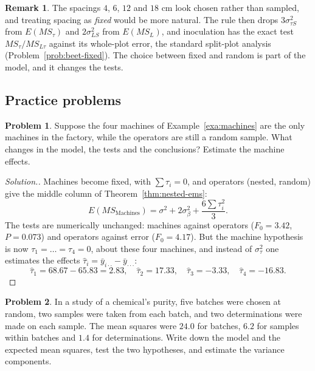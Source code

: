 \documentclass[11pt,a4paper]{article}
\numberwithin{equation}{section}
\theoremstyle{definition}
\newtheorem*{remark}{Remark}
\newtheorem{problemx}{Problem}[subsection]
\newenvironment{problem}{\begin{problemx}}{\end{problemx}}
\newenvironment{solution}
  {\renewcommand{\qedsymbol}{}\begin{proof}[\textit{Solution}.]}
  {\end{proof}}
\begin{document}
\begin{remark}
The spacings $4$, $6$, $12$ and $18$ cm look chosen rather than sampled, and treating spacing as \emph{fixed} would be more natural. The rule then drops $3\sigma^2_{\tau S}$ from
$E(MS_\tau)$ and $2\sigma^2_{LS}$ from $E(MS_L)$, and inoculation has the exact test $MS_\tau/MS_{L\tau}$ against its whole-plot error, the standard split-plot analysis
(Problem~\ref{prob:beet-fixed}). The choice between fixed and random is part of the model, and it changes the tests.
\end{remark}

\subsection{Practice problems}

\begin{problem}
Suppose the four machines of Example~\ref{exa:machines} are the only machines in the factory, while the operators are still a random sample. What changes
in the model, the tests and the conclusions? Estimate the machine effects.
\end{problem}

\begin{solution}
Machines become fixed, with $\sum\tau_i = 0$, and operators (nested, random) give the middle column of Theorem~\ref{thm:nested-ems}:
\[
E(MS_{\mathrm{Machines}}) = \sigma^2 + 2\sigma^2_\beta + \frac{6\sum\tau_i^2}3 .
\]
The tests are numerically unchanged: machines against operators ($F_0 = 3.42$, $P = 0.073$) and operators against error ($F_0 = 4.17$). But the machine hypothesis
is now $\tau_1 = \dots = \tau_4 = 0$, about these four machines, and instead of $\sigma^2_\tau$ one estimates the effects $\hat\tau_i = \bar y_{i\cdot\cdot} - \bar y_{\cdot\cdot\cdot}$:
\[
\hat\tau_1 = 68.67 - 65.83 = 2.83 , \quad \hat\tau_2 = 17.33 , \quad \hat\tau_3 = -3.33 , \quad \hat\tau_4 = -16.83 .
\]
\end{solution}

\begin{problem}
In a study of a chemical's purity, five batches were chosen at random, two samples were taken from each batch, and two determinations were made
on each sample. The mean squares were $24.0$ for batches, $6.2$ for samples within batches and $1.4$ for determinations. Write down the model and the
expected mean squares, test the two hypotheses, and estimate the variance components.
\end{problem}
\end{document}
